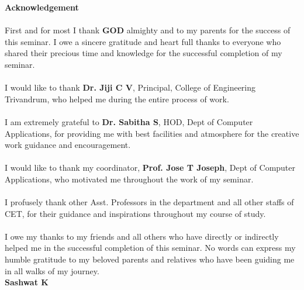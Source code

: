 \begin{titlepage}
\begin{center}
\textbf{\LARGE{Acknowledgement}}\\[0.5cm] 
\end{center}
\paragraph{\hspace{1cm}}
First and for most I thank \textbf{GOD} almighty and to my parents for the success of this seminar. I owe a sincere gratitude and heart full thanks to everyone who shared their precious time and knowledge for the successful completion of my seminar.
\paragraph{\hspace{1cm}}
I would like to thank \textbf{Dr. Jiji C V}, Principal,  College of Engineering Trivandrum, who helped me during the entire process of work.
\paragraph{\hspace{1cm}}
I am extremely grateful to \textbf{Dr. Sabitha S}, HOD, Dept of Computer Applications, for providing me with best facilities and atmosphere for the creative work guidance and encouragement.
\paragraph{\hspace{1cm}}
I would like to thank my coordinator,\textbf{ Prof. Jose T Joseph}, Dept of Computer Applications, who motivated me throughout the work of my seminar.  
\paragraph{\hspace{1cm}}
I profusely thank other Asst. Professors in the department and all other staffs of CET, for their guidance and inspirations throughout my course of study.
\paragraph{\hspace{1cm}}
I owe my thanks to my friends and all others who have directly or indirectly helped me in the successful completion of this seminar. No words can express my humble gratitude to my beloved parents and relatives who have been guiding me in all walks of my journey.\\

 \vspace{1.1cm}
\hspace{345pt} \textbf{Sashwat K}


\end{titlepage}
